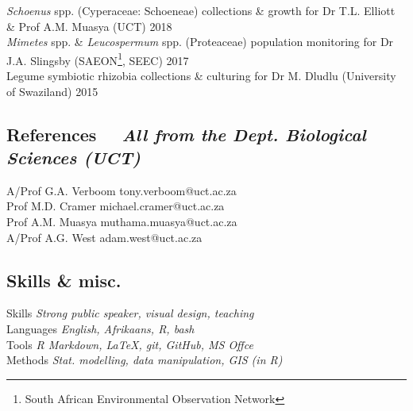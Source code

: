 \documentclass[10pt]{article}
\begin{document}
\textit{Schoenus} spp. (Cyperaceae: Schoeneae)
  collections \& growth for Dr T.L. Elliott \& Prof A.M.
  Muasya {\small (UCT)}                                  \hfill {\small 2018} \\
\textit{Mimetes} spp. \& \textit{Leucospermum} spp.
  (Proteaceae) population monitoring for Dr J.A. Slingsby
  {\small (SAEON\footnote{South African Environmental
  Observation Network}, SEEC)}                           \hfill {\small 2017} \\
Legume symbiotic rhizobia collections \& culturing for
  Dr M. Dludlu {\small (University of Swaziland)}        \hfill {\small 2015}

\hrulefill

\begin{multicols}{2}

\subsection*{References %
  ~~{\small \textmd{\textit{All from the Dept. Biological Sciences (UCT)}}}}

A/Prof G.A. Verboom                           \hfill   tony.verboom@uct.ac.za \\
Prof M.D. Cramer                              \hfill michael.cramer@uct.ac.za \\
Prof A.M. Muasya                              \hfill muthama.muasya@uct.ac.za \\
A/Prof A.G. West                              \hfill      adam.west@uct.ac.za

\columnbreak

\subsection*{Skills \& misc.} %


Skills         \hfill \textit{Strong public speaker, visual design, teaching} \\
Languages      \hfill \textit{                   English, Afrikaans, R, bash} \\
Tools          \hfill \textit{      R Markdown, LaTeX, git, GitHub, MS Offce} \\
Methods        \hfill \textit{Stat. modelling, data manipulation, GIS (in R)}

\end{multicols}
\end{document}
